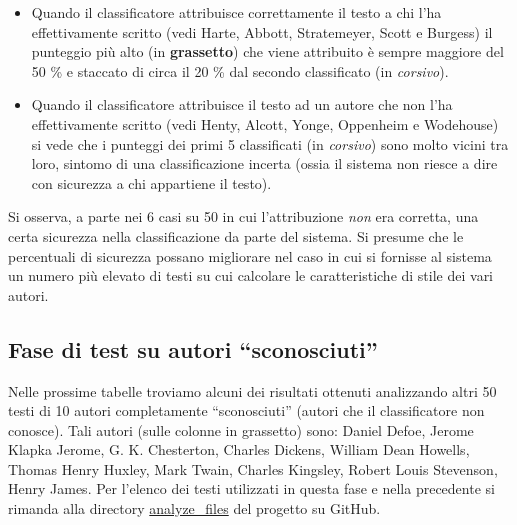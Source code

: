\documentclass[titlepage]{article}
\begin{document}
\begin{itemize}
    \item Quando il classificatore attribuisce correttamente il testo a chi l'ha effettivamente scritto (vedi Harte, Abbott, Stratemeyer, Scott e Burgess) il punteggio più alto (in \textbf{grassetto}) che viene attribuito è sempre maggiore del 50 \% e staccato di circa il 20 \% dal secondo classificato (in \textit{corsivo}).
    \item Quando il classificatore attribuisce il testo ad un autore che non l'ha effettivamente scritto (vedi Henty, Alcott, Yonge, Oppenheim e Wodehouse) si vede che i punteggi dei primi 5 classificati (in \textit{corsivo}) sono molto vicini tra loro, sintomo di una classificazione incerta (ossia il sistema non riesce a dire con sicurezza a chi appartiene il testo).
\end{itemize}
Si osserva, a parte nei 6 casi su 50 in cui l'attribuzione \textit{non} era corretta, una certa sicurezza nella classificazione da parte del sistema. Si presume che le percentuali di sicurezza possano migliorare nel caso in cui si fornisse al sistema un numero più elevato di testi su cui calcolare le caratteristiche di stile dei vari autori.

\subsection{Fase di test su autori ``sconosciuti''}
Nelle prossime tabelle troviamo alcuni dei risultati ottenuti analizzando altri 50 testi di 10 autori completamente ``sconosciuti'' (autori che il classificatore non conosce). Tali autori (sulle colonne in grassetto) sono: Daniel Defoe, Jerome Klapka Jerome, G. K. Chesterton, Charles Dickens, William Dean Howells, Thomas Henry Huxley, Mark Twain, Charles Kingsley, Robert Louis Stevenson, Henry James. Per l'elenco dei testi utilizzati in questa fase e nella precedente si rimanda alla directory \href{https://github.com/zampierida98/authorship/tree/main/analyze_files}{analyze\_files} del progetto su GitHub.
\end{document}
